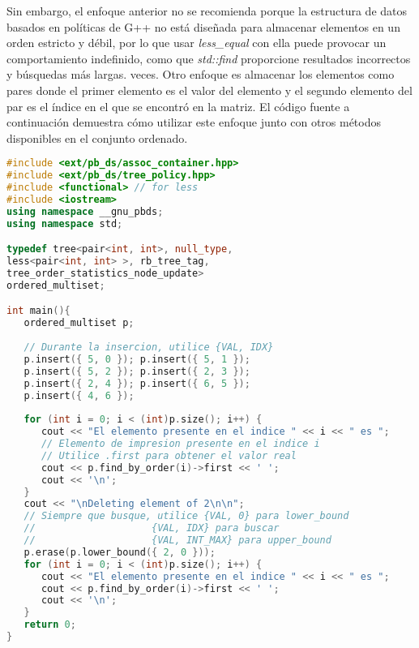 Sin embargo, el enfoque anterior no se recomienda porque la estructura de datos basados en políticas de G++ no está diseñada para almacenar elementos en un orden estricto y débil, por lo que usar \emph{less\_equal} con ella puede provocar un comportamiento indefinido, como que \emph{std::find} proporcione resultados incorrectos y búsquedas más largas. veces. Otro enfoque es almacenar los elementos como pares donde el primer elemento es el valor del elemento y el segundo elemento del par es el índice en el que se encontró en la matriz. El código fuente a continuación demuestra cómo utilizar este enfoque junto con otros métodos disponibles en el conjunto ordenado.

\begin{lstlisting}[language=C++]
#include <ext/pb_ds/assoc_container.hpp>
#include <ext/pb_ds/tree_policy.hpp>
#include <functional> // for less
#include <iostream>
using namespace __gnu_pbds;
using namespace std;

typedef tree<pair<int, int>, null_type,
less<pair<int, int> >, rb_tree_tag,
tree_order_statistics_node_update>
ordered_multiset;

int main(){
   ordered_multiset p;
   
   // Durante la insercion, utilice {VAL, IDX}
   p.insert({ 5, 0 }); p.insert({ 5, 1 });
   p.insert({ 5, 2 }); p.insert({ 2, 3 });
   p.insert({ 2, 4 }); p.insert({ 6, 5 });
   p.insert({ 4, 6 });
   
   for (int i = 0; i < (int)p.size(); i++) {
      cout << "El elemento presente en el indice " << i << " es ";
      // Elemento de impresion presente en el indice i
      // Utilice .first para obtener el valor real
      cout << p.find_by_order(i)->first << ' '; 
      cout << '\n';
   }
   cout << "\nDeleting element of 2\n\n";
   // Siempre que busque, utilice {VAL, 0} para lower_bound
   //					 {VAL, IDX} para buscar
   //					 {VAL, INT_MAX} para upper_bound
   p.erase(p.lower_bound({ 2, 0 }));
   for (int i = 0; i < (int)p.size(); i++) {
      cout << "El elemento presente en el indice " << i << " es ";
      cout << p.find_by_order(i)->first << ' ';
      cout << '\n';
   }
   return 0;
}
\end{lstlisting}
